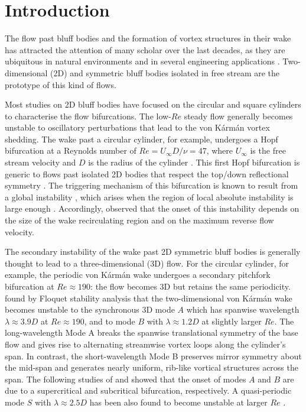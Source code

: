 \section{Introduction}
\label{sec:intro}

The flow past bluff bodies and the formation of vortex structures in their wake has attracted the attention of many scholar over the last decades, as they are ubiquitous in natural environments and in several engineering applications \citep{oertel-1990,williamson-1996b,choi-etal-2008,thompson-etal-2021}. Two-dimensional (2D) and symmetric bluff bodies isolated in free stream are the prototype of this kind of flows.

Most studies on 2D bluff bodies have focused on the circular and square cylinders to characterise the flow bifurcations. The low-$Re$ steady flow generally becomes unstable to oscillatory perturbations that lead to the von K\'{a}rm\'{a}n vortex shedding. The wake past a circular cylinder, for example, undergoes a Hopf bifurcation at a Reynolds number of $Re = U_\infty D /\nu = 47$, where $U_\infty$ is the free stream velocity and $D$ is the radius of the cylinder \citep{noack.eckelmann-1994-globalstability}. This first Hopf bifurcation is generic to flows past isolated 2D bodies that respect the top/down reflectional symmetry \citep{jackson-1987-finiteelementstudy,chiarini-quadrio-auteri-2022b}. The triggering mechanism of this bifurcation is known to result from a global instability \citep{jackson-1987-finiteelementstudy}, which arises when the region of local absolute instability is large enough \citep{chomaz-2005}. Accordingly, \cite{chiarini-quadrio-auteri-2022b} observed that the onset of this instability depends on the size of the wake recirculating region and on the maximum reverse flow velocity.

The secondary instability of the wake past 2D symmetric bluff bodies is generally thought to lead to a three-dimensional (3D) flow. For the circular cylinder, for example, the periodic von K\'{a}rm\'{a}n wake undergoes a secondary pitchfork bifurcation at $Re \approx 190$: the flow becomes 3D but retains the same periodicity. \cite{barkley-henderson-1996} found by Floquet stability analysis that the two-dimensional von K\'{a}rm\'{a}n wake becomes unstable to the synchronous 3D mode $A$ which has spanwise wavelength $\lambda \approx 3.9 D$ at $Re \approx 190$, and to mode $B$ with $\lambda \approx 1.2 D$ at slightly larger $Re$. The long-wavelength Mode A breaks the spanwise translational symmetry of the base flow and gives rise to alternating streamwise vortex loops along the cylinder's span. In contrast, the short-wavelength Mode B preserves mirror symmetry about the mid-span and generates nearly uniform, rib-like vortical structures across the span. The following studies of \cite{henderson-barkley-1996} and \cite{henderson-1997} showed that the onset of modes $A$ and $B$ are due to a supercritical and subcritical bifurcation, respectively. A quasi-periodic mode $S$ with $\lambda \approx 2.5D$ has been also found to become unstable at larger $Re$ \citep{blackburn-lopez-2003,blackburn-etal-2005,blackburn-sheard-2010}. 

